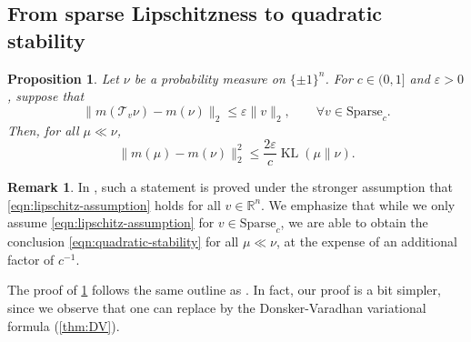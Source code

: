 \documentclass[11pt,reqno,letterpaper]{amsart}
\numberwithin{equation}{section}
\newtheorem{proposition}[theorem]{Proposition}
\theoremstyle{definition}
\newtheorem{remark}[theorem]{Remark}
\newcommand{\mb}{\mathbb}
\newcommand{\mc}{\mathcal}
\newcommand{\on}{\operatorname}
\newcommand{\KL}{\operatorname{KL}}
\newcommand{\eps}{\varepsilon}
\begin{document}
\subsection{From sparse Lipschitzness to quadratic stability}



\begin{proposition}
\label{prop:lemma69}
    Let $\nu$ be a probability measure on $\{\pm 1\}^n$. %
    For $c \in (0,1]$ and $\eps > 0$, suppose that
    \begin{equation}
    \label{eqn:lipschitz-assumption}
        \|m(\mc{T}_v \nu) - m(\nu) \|_{2} \leq \eps \|v\|_2, \qquad \forall v \in \mathrm{Sparse}_c.
    \end{equation}
    Then, for all $\mu \ll \nu$,
    \begin{equation}
    \label{eqn:quadratic-stability}
    \|m(\mu) - m(\nu) \|_{2}^{2} \leq \frac{2\eps}{c} \KL(\mu \| \nu).     \end{equation}
\end{proposition}

\begin{remark}
In \cite[Lemma~69]{chen2022localization}, such a statement is proved under the stronger assumption that \cref{eqn:lipschitz-assumption} holds for all $v \in \mb{R}^n$. We emphasize that while we only assume \cref{eqn:lipschitz-assumption} for $v \in \mathrm{Sparse}_c$, we are able to obtain the conclusion \cref{eqn:quadratic-stability} for all $\mu \ll \nu$, at the expense of an additional factor of $c^{-1}$. 
\end{remark}






The proof of \cref{prop:lemma69} follows the same outline as \cite[Lemma~69]{chen2022localization}. In fact, our proof is a bit simpler, since we observe that one can replace \cite[Lemma~33]{chen2022localization} by the Donsker-Varadhan variational formula (\cref{thm:DV}). 
\end{document}
